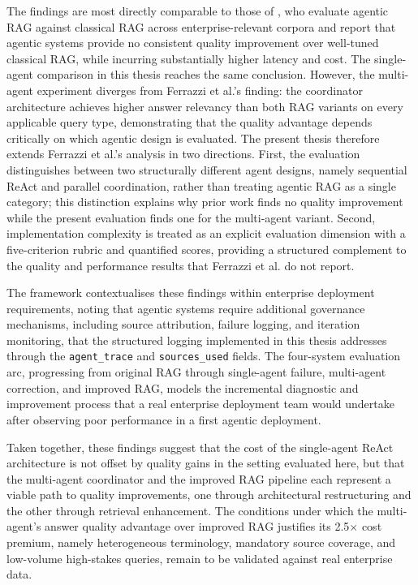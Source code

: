The findings are most directly comparable to those of , who evaluate agentic RAG against classical RAG across enterprise-relevant corpora and report that agentic systems provide no consistent quality improvement over well-tuned classical RAG, while incurring substantially higher latency and cost. The single-agent comparison in this thesis reaches the same conclusion. However, the multi-agent experiment diverges from Ferrazzi et al.'s finding: the coordinator architecture achieves higher answer relevancy than both RAG variants on every applicable query type, demonstrating that the quality advantage depends critically on which agentic design is evaluated. The present thesis therefore extends Ferrazzi et al.'s analysis in two directions. First, the evaluation distinguishes between two structurally different agent designs, namely sequential ReAct and parallel coordination, rather than treating agentic RAG as a single category; this distinction explains why prior work finds no quality improvement while the present evaluation finds one for the multi-agent variant. Second, implementation complexity is treated as an explicit evaluation dimension with a five-criterion rubric and quantified scores, providing a structured complement to the quality and performance results that Ferrazzi et al. do not report.

The  framework contextualises these findings within enterprise deployment requirements, noting that agentic systems require additional governance mechanisms, including source attribution, failure logging, and iteration monitoring, that the structured logging implemented in this thesis addresses through the \texttt{agent\_trace} and \texttt{sources\_used} fields. The four-system evaluation arc, progressing from original RAG through single-agent failure, multi-agent correction, and improved RAG, models the incremental diagnostic and improvement process that a real enterprise deployment team would undertake after observing poor performance in a first agentic deployment.

Taken together, these findings suggest that the cost of the single-agent ReAct architecture is not offset by quality gains in the setting evaluated here, but that the multi-agent coordinator and the improved RAG pipeline each represent a viable path to quality improvements, one through architectural restructuring and the other through retrieval enhancement. The conditions under which the multi-agent's answer quality advantage over improved RAG justifies its 2.5$\times$ cost premium, namely heterogeneous terminology, mandatory source coverage, and low-volume high-stakes queries, remain to be validated against real enterprise data.
